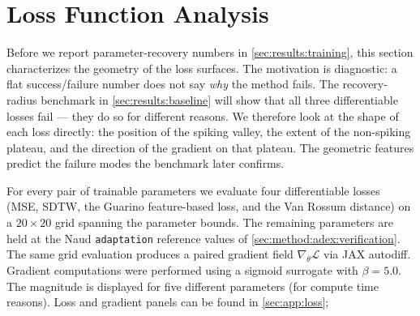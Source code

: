 \section{Loss Function Analysis}\label{sec:results:landscape}

Before we report parameter-recovery numbers in \cref{sec:results:training}, this section characterizes the geometry of the loss surfaces.
The motivation is diagnostic: a flat success/failure number does not say \emph{why} the method fails.
The recovery-radius benchmark in \cref{sec:results:baseline} will show that all three differentiable losses fail --- they do so for different reasons.
We therefore look at the shape of each loss directly: the position of the spiking valley, the extent of the non-spiking plateau, and the direction of the gradient on that plateau.
The geometric features predict the failure modes the benchmark later confirms.

For every pair of trainable parameters we evaluate four differentiable losses (\gls{MSE}, \gls{SDTW}, the Guarino feature-based loss, and the Van Rossum distance) on a $20\times 20$ grid spanning the parameter bounds.
The remaining parameters are held at the Naud \texttt{adaptation} reference values of \cref{sec:method:adex:verification}.
The same grid evaluation produces a paired gradient field $\nabla_{\theta}\mathcal{L}$ via JAX autodiff.
Gradient computations were performed using a sigmoid surrogate with $\beta = 5.0$.
The magnitude is displayed for five different parameters (for compute time reasons).
Loss and gradient panels can be found in \cref{sec:app:loss};

